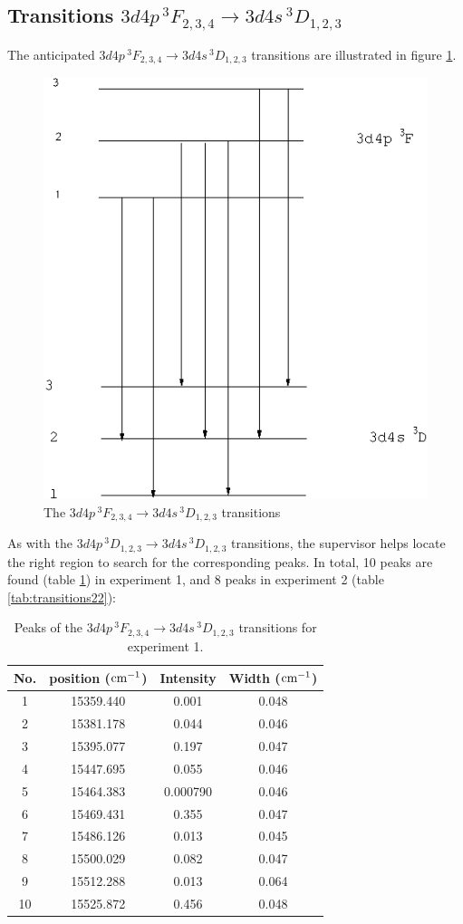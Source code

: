 \documentclass[a4paper]{article}
\begin{document}
\subsection{Transitions $3d4p\,^3F_{2,3,4} \to 3d4s\,^3D_{1,2,3}$}
The anticipated $3d4p\,^3F_{2,3,4} \to 3d4s\,^3D_{1,2,3}$ transitions
are illustrated in figure \ref{fig:transition2}.
\begin{figure}[htb!]
\centering
\includegraphics[scale=0.35]{transition2}
\caption{The $3d4p\,^3F_{2,3,4} \to 3d4s\,^3D_{1,2,3}$ transitions}
\label{fig:transition2}
\end{figure}
As with the $3d4p\,^3D_{1,2,3} \to 3d4s\,^3D_{1,2,3}$ transitions, the supervisor
helps locate the right region to search for the corresponding peaks. In total, 10 peaks are
found (table \ref{tab:transitions21}) in experiment 1, and 8 peaks in experiment 2 (table \ref{tab:transitions22}):
\begin{table}[htb!]
\centering
\begin{tabular}{c|c|c|c}
\hline
No. & position ($\rm cm^{-1}$) & Intensity & Width ($\rm cm^{-1}$) \\
\hline
1 & 15359.440 & 0.001 & 0.048 \\
2 & 15381.178 & 0.044 & 0.046 \\
3 & 15395.077 & 0.197 & 0.047 \\
4 & 15447.695 & 0.055 & 0.046 \\
5 & 15464.383 & 0.000790 & 0.046 \\
6 & 15469.431 & 0.355 & 0.047 \\
7 & 15486.126 & 0.013 & 0.045 \\
8 & 15500.029 & 0.082 & 0.047 \\
9 & 15512.288 & 0.013 & 0.064 \\
10 & 15525.872 & 0.456 & 0.048 \\
\hline
\end{tabular}
\caption{Peaks of the $3d4p\,^3F_{2,3,4} \to 3d4s\,^3D_{1,2,3}$ transitions for experiment 1.}
\label{tab:transitions21}
\end{table}
\end{document}
